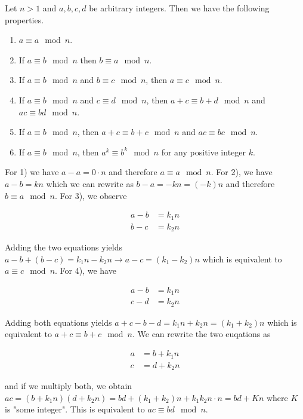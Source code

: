 \begin{theorem}
    Let $n > 1$ and $a, b, c, d$ be arbitrary integers. Then we have the following properties.

    \begin{enumerate}
        \item $a \equiv a \mod n$.
        \item If $a \equiv b \mod n$ then $b \equiv a \mod n$.
        \item If $a \equiv b \mod n$ and $b \equiv c \mod n$, then $a \equiv c \mod n$.
        \item If $a \equiv b \mod n$ and $c \equiv d \mod n$, then $a+c \equiv b+d \mod n$ and $ac \equiv bd \mod n$.
        \item If $a \equiv b \mod n$, then $a+c \equiv b+c \mod n$ and $ac \equiv bc \mod n$.
        \item If $a \equiv b \mod n$, then $a^k \equiv b^k \mod n$ for any positive integer $k$.
    \end{enumerate}

\end{theorem}

For 1) we have $a - a = 0 \cdot n$ and therefore $a \equiv a \mod n$. For 2), we have $a - b = kn$ which we can rewrite as $b - a = -kn = (-k)n$ and therefore $b \equiv a \mod n$. For 3), we observe 

\begin{align}
    a - b &= k_1 n \\
    b - c &= k_2 n
\end{align}

Adding the two equations yields $a - b + (b - c) = k_1 n - k_2 n \rightarrow a - c = (k_1-k_2)n$ which is equivalent to $a \equiv c \mod n$. For 4), we have

\begin{align}
    a - b &= k_1 n \\
    c - d &= k_2 n
\end{align}

Adding both equations yields $a + c - b - d = k_1 n + k_2 n = (k_1 + k_2)n$ which is equivalent to $a+c \equiv b+c \mod n$. We can rewrite the two euqations as

\begin{align}
    a &= b + k_1 n \\
    c &= d + k_2 n
\end{align}

and if we multiply both, we obtain $ac = (b + k_1 n)(d + k_2 n) =bd  + (k_1 + k_2)n + k_1 k_2 n \cdot n = bd + K n$ where $K$ is "some integer". This is equivalent to $ac \equiv bd \mod n$.

